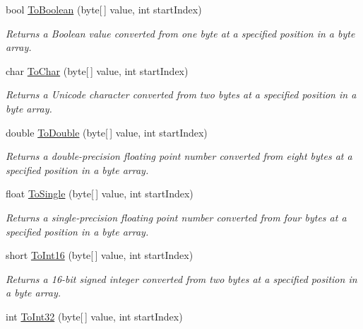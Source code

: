 \begin{DoxyCompactItemize}
bool \mbox{\hyperlink{class_t_net_1_1_i_o_1_1_endian_bit_converter_ac08a3108ce00f7bbc088c361777bce52}{To\+Boolean}} (byte\mbox{[}$\,$\mbox{]} value, int start\+Index)
\begin{DoxyCompactList}\small\item\em Returns a Boolean value converted from one byte at a specified position in a byte array. \end{DoxyCompactList}\item 
char \mbox{\hyperlink{class_t_net_1_1_i_o_1_1_endian_bit_converter_a04b97d937753db34e5184a3f9140a644}{To\+Char}} (byte\mbox{[}$\,$\mbox{]} value, int start\+Index)
\begin{DoxyCompactList}\small\item\em Returns a Unicode character converted from two bytes at a specified position in a byte array. \end{DoxyCompactList}\item 
double \mbox{\hyperlink{class_t_net_1_1_i_o_1_1_endian_bit_converter_a46f2f5e1fee257fae892768be7fbd24d}{To\+Double}} (byte\mbox{[}$\,$\mbox{]} value, int start\+Index)
\begin{DoxyCompactList}\small\item\em Returns a double-\/precision floating point number converted from eight bytes at a specified position in a byte array. \end{DoxyCompactList}\item 
float \mbox{\hyperlink{class_t_net_1_1_i_o_1_1_endian_bit_converter_a8f2ff9046650f0fea88be0cd90b7ef26}{To\+Single}} (byte\mbox{[}$\,$\mbox{]} value, int start\+Index)
\begin{DoxyCompactList}\small\item\em Returns a single-\/precision floating point number converted from four bytes at a specified position in a byte array. \end{DoxyCompactList}\item 
short \mbox{\hyperlink{class_t_net_1_1_i_o_1_1_endian_bit_converter_a57927039a631af103ed63e8b0a91e660}{To\+Int16}} (byte\mbox{[}$\,$\mbox{]} value, int start\+Index)
\begin{DoxyCompactList}\small\item\em Returns a 16-\/bit signed integer converted from two bytes at a specified position in a byte array. \end{DoxyCompactList}\item 
int \mbox{\hyperlink{class_t_net_1_1_i_o_1_1_endian_bit_converter_aa8b78416e423bdbc0bdae03ade423796}{To\+Int32}} (byte\mbox{[}$\,$\mbox{]} value, int start\+Index)

\end{DoxyCompactItemize}

